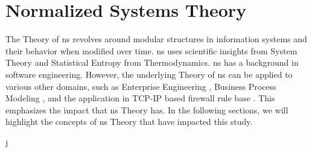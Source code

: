 \section{Normalized Systems Theory} \label{sec_ns_theory}

The Theory of \gls{ns} revolves around modular structures in information systems and their
behavior when modified over time. \gls{ns} uses scientific insights from System Theory and
Statistical Entropy from Thermodynamics. \gls{ns} has a background in software
engineering. However, the underlying Theory of \gls{ns} can be applied to various other
domains, such as Enterprise Engineering \parencite{huysmans_towards_2013}, Business
Process Modeling \parencite{van_nuel_towards_2011}, and the application in TCP-IP based
firewall rule base \parencite{haerens_evolvability_2021}. This emphasizes the impact that
\gls{ns} Theory has. In the following sections, we will highlight the concepts of
\gls{ns} Theory that have impacted this study.





j
